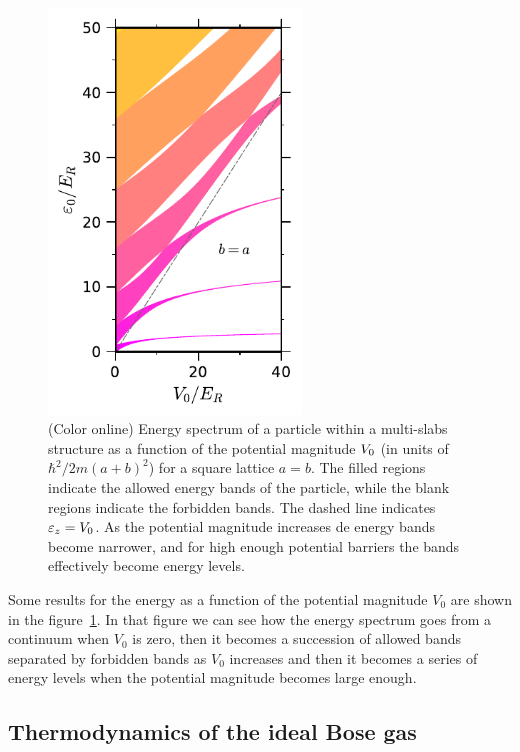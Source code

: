 \begin{figure}
  \centering
  \includegraphics[width=0.6\textwidth]{./figures/energy-spectrum[ideal]_r-1}
	\caption{(Color online) Energy spectrum of a particle within a multi-slabs
  structure as a function of the potential magnitude ${V_0}$ (in units of
  $\hbar^2 / 2m(a+b)^2$) for a square lattice $a=b$. The filled regions indicate
  the allowed energy bands of the particle, while the blank regions indicate the
  forbidden bands. The dashed line indicates ${\varepsilon}_{z} = {V_0}$. As the potential
  magnitude increases de energy bands become narrower, and for high enough
  potential barriers the bands effectively become energy
  levels.}\label{fig:ideal-energy-per-boson-as-u0-r-1}
\end{figure}

Some results for the energy as a function of the potential magnitude $V_0$ are
shown in the figure~\ref{fig:ideal-energy-per-boson-as-u0-r-1}. In that figure
we can see how the energy spectrum goes from a continuum when $V_0$ is zero,
then it becomes a succession of allowed bands separated by forbidden bands as
$V_0$ increases and then it becomes a series of energy levels when the potential
magnitude becomes large enough.

\subsection{Thermodynamics of the ideal Bose gas}

